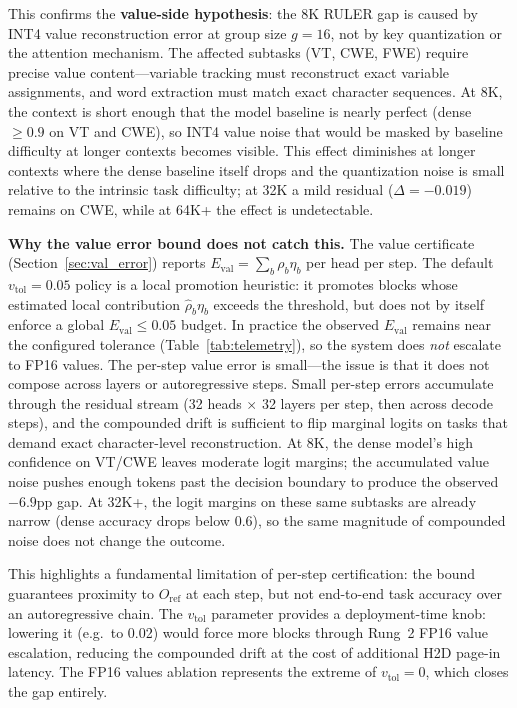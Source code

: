 \documentclass[10pt,twocolumn,a4paper]{article}
\theoremstyle{definition}
\theoremstyle{remark}
\begin{document}
This confirms the \textbf{value-side hypothesis}: the 8K RULER gap is caused by INT4 value reconstruction error at group size $g{=}16$, not by key quantization or the attention mechanism.  The affected subtasks (VT, CWE, FWE) require precise value content---variable tracking must reconstruct exact variable assignments, and word extraction must match exact character sequences.  At 8K, the context is short enough that the model baseline is nearly perfect (dense ${\geq}0.9$ on VT and CWE), so INT4 value noise that would be masked by baseline difficulty at longer contexts becomes visible.  This effect diminishes at longer contexts where the dense baseline itself drops and the quantization noise is small relative to the intrinsic task difficulty; at 32K a mild residual ($\Delta{=}{-}0.019$) remains on CWE, while at 64K+ the effect is undetectable.

\textbf{Why the value error bound does not catch this.}  The value certificate (Section~\ref{sec:val_error}) reports $E_{\mathrm{val}} = \sum_b \rho_b \eta_b$ per head per step.  The default $v_{\mathrm{tol}}{=}0.05$ policy is a local promotion heuristic: it promotes blocks whose estimated local contribution $\hat{\rho}_b \eta_b$ exceeds the threshold, but does not by itself enforce a global $E_{\mathrm{val}} \leq 0.05$ budget.  In practice the observed $E_{\mathrm{val}}$ remains near the configured tolerance (Table~\ref{tab:telemetry}), so the system does \emph{not} escalate to FP16 values.  The per-step value error is small---the issue is that it does not compose across layers or autoregressive steps.  Small per-step errors accumulate through the residual stream (32 heads $\times$ 32 layers per step, then across decode steps), and the compounded drift is sufficient to flip marginal logits on tasks that demand exact character-level reconstruction.  At 8K, the dense model's high confidence on VT/CWE leaves moderate logit margins; the accumulated value noise pushes enough tokens past the decision boundary to produce the observed $-6.9$pp gap.  At 32K+, the logit margins on these same subtasks are already narrow (dense accuracy drops below 0.6), so the same magnitude of compounded noise does not change the outcome.

This highlights a fundamental limitation of per-step certification: the bound guarantees proximity to $O_{\mathrm{ref}}$ at each step, but not end-to-end task accuracy over an autoregressive chain.  The $v_{\mathrm{tol}}$ parameter provides a deployment-time knob: lowering it (e.g.\ to 0.02) would force more blocks through Rung~2 FP16 value escalation, reducing the compounded drift at the cost of additional H2D page-in latency.  The FP16 values ablation represents the extreme of $v_{\mathrm{tol}}{=}0$, which closes the gap entirely.
\end{document}

